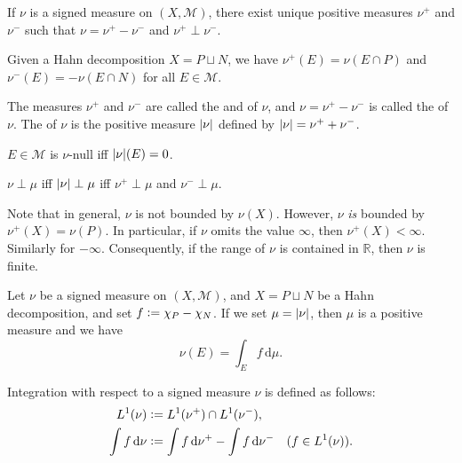 \documentclass[12pt]{article}	%
\begin{document}
\begin{thm}
	If $\nu$ is a signed measure on $(X, \mathcal{M})$, there exist unique positive measures $\nu^{+}$ and $\nu^{-}$ such that $\nu = \nu^{+} - \nu^{-}$ and $\nu^{+} \perp \nu^{-}$.

	Given a Hahn decomposition $X = P \sqcup N$, we have $\nu^{+}(E) = \nu(E \cap P)$ and $\nu^{-}(E) = -\nu(E \cap N)$ for all $E \in \mathcal{M}$.
\end{thm}

The measures $\nu^{+}$ and $\nu^{-}$ are called the  and  of $\nu$, and $\nu = \nu^{+} - \nu^{-}$ is called the  of $\nu$. The  of $\nu$ is the positive measure ${\left\lvert \nu \right\lvert}$ defined by ${\left\lvert \nu \right\lvert} = \nu^{+} + \nu^{-}$.

\begin{exe}
	$E \in \mathcal{M}$ is $\nu$-null iff ${\left\lvert \nu \right\lvert}(E) = 0$.

	$\nu \perp \mu$ iff ${\left\lvert \nu \right\lvert} \perp \mu$ iff $\nu^{+} \perp \mu$ and $\nu^{-} \perp \mu$.
\end{exe}

\begin{obs}
	Note that in general, $\nu$ is not bounded by $\nu(X)$. However, $\nu$ \emph{is} bounded by $\nu^{+}(X) = \nu(P)$. In particular, if $\nu$ omits the value $\infty$, then $\nu^{+}(X) < \infty$. Similarly for $-\infty$. \newline
	Consequently, if the range of $\nu$ is contained in $\mathbb{R}$, then $\nu$ is finite.
\end{obs}

\begin{obs}
	Let $\nu$ be a signed measure on $(X, \mathcal{M})$, and $X = P \sqcup N$ be a Hahn decomposition, and set $f \vcentcolon= \chi_{P} - \chi_{N}$. If we set $\mu = {\left\lvert \nu \right\lvert}$, then $\mu$ is a positive measure and we have
	\begin{equation*} 
		\nu(E) = \int_{E} f \,{\mathrm{d}}\mu.
	\end{equation*}
\end{obs}

Integration with respect to a signed measure $\nu$ is defined as follows:
\begin{align*} 
	L^{1}(\nu) &\vcentcolon= L^{1}(\nu^{+}) \cap L^{1}(\nu^{-}), \\
	\int f \,{\mathrm{d}}\nu &\vcentcolon= \int f \,{\mathrm{d}}\nu^{+} - \int f \,{\mathrm{d}}\nu^{-} \quad (f \in L^{1}(\nu)).
\end{align*}
\end{document}

